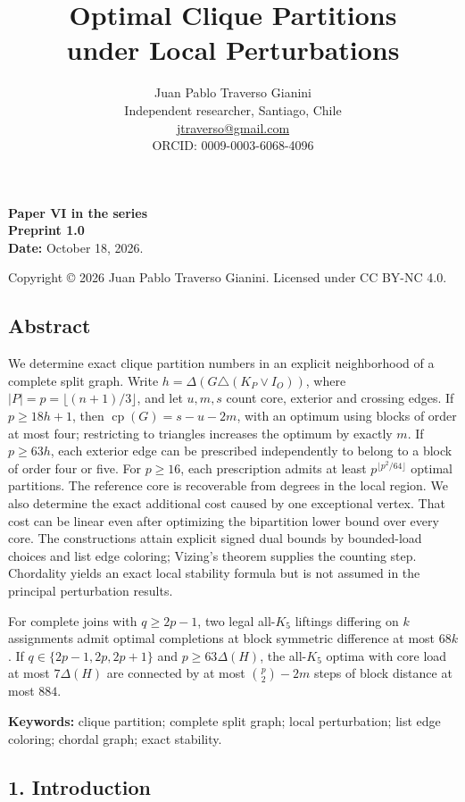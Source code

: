 \documentclass[english,11pt,a4paper]{article}
\title{Optimal Clique Partitions\\under Local Perturbations}
\author{Juan Pablo Traverso Gianini\\\small Independent researcher, Santiago, Chile\\\small \href{mailto:jtraverso@gmail.com}{jtraverso@gmail.com}\\\small ORCID: 0009-0003-6068-4096}
\date{}
\begin{document}
\raggedbottom\maketitle
\textbf{Paper VI in the series}\\
\textbf{Preprint 1.0}\\
\textbf{Date:} October 18, 2026.

Copyright © 2026 Juan Pablo Traverso Gianini. Licensed under CC BY-NC 4.0.

\subsection{Abstract}\label{abstract}

We determine exact clique partition numbers in an explicit neighborhood
of a complete split graph. Write \(h=\Delta(G\triangle(K_P\vee I_O))\),
where \(|P|=p=\lfloor(n+1)/3\rfloor\), and let \(u,m,s\) count core,
exterior and crossing edges. If \(p\ge18h+1\), then
\(\operatorname{cp}(G)=s-u-2m\), with an optimum using blocks of order
at most four; restricting to triangles increases the optimum by exactly
\(m\). If \(p\ge63h\), each exterior edge can be prescribed
independently to belong to a block of order four or five. For
\(p\ge16\), each prescription admits at least
\(p^{\lfloor p^2/64\rfloor}\) optimal partitions. The reference core is
recoverable from degrees in the local region. We also determine the
exact additional cost caused by one exceptional vertex. That cost can be
linear even after optimizing the bipartition lower bound over every
core. The constructions attain explicit signed dual bounds by
bounded-load choices and list edge coloring; Vizing's theorem supplies
the counting step. Chordality yields an exact local stability formula
but is not assumed in the principal perturbation results.

For complete joins with \(q\ge2p-1\), two legal all-\(K_5\) liftings
differing on \(k\) assignments admit optimal completions at block
symmetric difference at most \(68k\). If \(q\in\{2p-1,2p,2p+1\}\) and
\(p\ge63\Delta(H)\), the all-\(K_5\) optima with core load at most
\(7\Delta(H)\) are connected by at most \(\binom p2-2m\) steps of block
distance at most \(884\).

\textbf{Keywords:} clique partition; complete split graph; local
perturbation; list edge coloring; chordal graph; exact stability.

\subsection{1. Introduction}\label{introduction}
\end{document}
